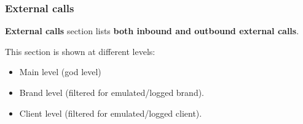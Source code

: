 \documentclass[letterpaper,10pt,english]{sphinxmanual}
\begin{document}
\subsubsection{External calls}
\label{administration_portal/client/wholesale/calls/external_calls::doc}\label{administration_portal/client/wholesale/calls/external_calls:external-calls}
\textbf{External calls} section lists \textbf{both inbound and outbound external calls}.

This section is shown at different levels:
\begin{itemize}
\item {} 
Main level (god level)

\item {} 
Brand level (filtered for emulated/logged brand).

\item {} 
Client level (filtered for emulated/logged client).

\end{itemize}
\end{document}
